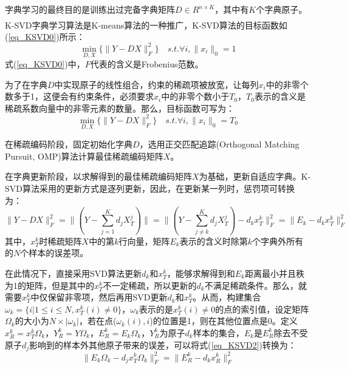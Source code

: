 \documentclass[11pt]{article}
\newcommand{\upcite}[1]{\textsuperscript{\textsuperscript{\cite{#1}}}}
\begin{document}
\par
字典学习的最终目的是训练出过完备字典矩阵$D \in R^{n \times K}$，其中有$K$个字典原子。K-SVD字典学习算法是K-means算法的一种推广，K-SVD算法的目标函数\upcite{HongT2016}如(\ref{eq_KSVD0})所示：
\begin{equation}\label{eq_KSVD0}
\min_{D,X} \{ \parallel Y-DX \parallel_F^2 \} \quad s.t. \forall i,\parallel x_i \parallel_0=1
\end{equation}
式(\ref{eq_KSVD0})中，$F$代表的含义是Frobenius范数。
\par
为了在字典$D$中实现原子的线性组合，约束的稀疏项被放宽，让每列$x_i$中的非零个数多于1，这便会有约束条件，必须要求$x_i$中的非零个数小于$T_0$，$T_0$表示的含义是稀疏系数向量中的非零元素的数量。那么，目标函数可写为：
\begin{equation}\label{eq_KSVD1}
\min_{D,X} \{ \parallel Y-DX \parallel_F^2 \} \quad s.t. \forall i,\parallel x_i \parallel_0=T_0
\end{equation}
\par
在稀疏编码阶段，固定初始化字典$D$，选用正交匹配追踪(Orthogonal Matching Pursuit, OMP)算法计算最佳稀疏编码矩阵$X$。
\par
在字典更新阶段，以求解得到的最佳稀疏编码矩阵$X$为基础，更新自适应字典。K-SVD算法采用的更新方式是逐列更新，因此，在更新某一列时，惩罚项可转换为：
\begin{equation}\label{eq_KSVD2}
\parallel Y-DX \parallel_F^2=\parallel (Y-\sum_{j=1}^K d_j X_T^j) \parallel=\parallel (Y-\sum_{j \neq k}^K d_j X_T^j)-d_k x_T^k \parallel_F^2=\parallel E_k-d_k x_T^k \parallel_F^2
\end{equation}
其中，$x_T^k$时稀疏矩阵$X$中的第$k$行向量，矩阵$E_k$表示的含义时除第$k$个字典外所有的$N$个样本的误差项。
\par
在此情况下，直接采用SVD算法更新$d_k$和$x_T^k$，能够求解得到和$E_k$距离最小并且秩为1的矩阵，但是其中的$x_T^k$不一定稀疏，所以更新的$d_k$不满足稀疏条件。那么，就需要$x_T^k$中仅保留非零项，然后再用SVD更新$d_k$和$x_T^k$。从而，构建集合$\omega_k=\{ i|1 \leq i \leq N,x_T^k(i) \neq 0 \}$，$\omega_k$表示的是$x_T^k(i) \neq 0$的点的索引值，设定矩阵$\Omega_k$的大小为$N \times |\omega_k|$，若在点($\omega_k(i),i$)的位置是1，则在其他位置点是0。定义$x_R^k=x_T^k \Omega_k$，$Y_R^k=Y \Omega_k$，$E_R^k=E_k \Omega_k$，$Y_R^k$为原子$d_k$样本的集合，$E_k$是$E_R^k$除去不受原子$d_j$影响到的样本外其他原子带来的误差，可以将式(\ref{eq_KSVD2})转换为：
\begin{equation}\label{eq_KSVD3}
\parallel E_k \Omega_k-d_j x_T^k \Omega_k \parallel_F^2=\parallel E_R^k-d_k x_R^k \parallel_F^2
\end{equation}
\end{document}
